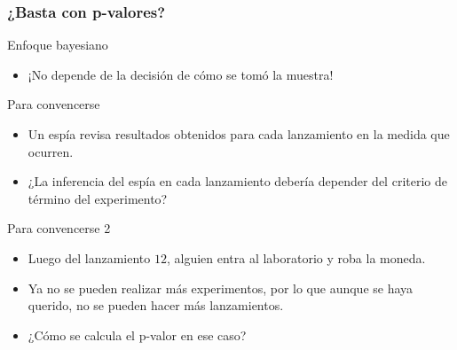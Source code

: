 \documentclass[table]{beamer}
\begin{document}
\begin{frame}
    \frametitle{¿Basta con p-valores?}
    \begin{alertblock}{Enfoque bayesiano}
        \begin{itemize}
            \item ¡No depende de la decisión de cómo se tomó la muestra!
        \end{itemize}
    \end{alertblock}
    \begin{block}{Para convencerse}
        \begin{itemize}
            \item Un espía revisa resultados obtenidos para cada lanzamiento en la medida que ocurren.
            \item ¿La inferencia del espía en cada lanzamiento debería depender del criterio de término del experimento?
        \end{itemize}
    \end{block}
    \begin{block}{Para convencerse 2}
        \begin{itemize}
            \item Luego del lanzamiento $12$, alguien entra al laboratorio y roba la moneda.
            \item Ya no se pueden realizar más experimentos, por lo que aunque se haya querido, no se pueden hacer más lanzamientos.
            \item ¿Cómo se calcula el p-valor en ese caso?
        \end{itemize}
    \end{block}
\end{frame}

\iffalse
\begin{frame}[allowframebreaks, noframenumbering]
\frametitle<presentation>{References}
\printbibliography
%
\end{frame}
\fi
\end{document}
